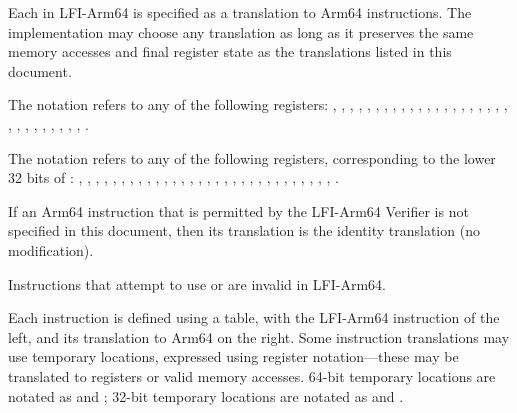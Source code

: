 
\providecommand{\xbase}{\code{x27}\xspace}
\providecommand{\xaddr}{\code{x28}\xspace}
\providecommand{\xret}{\code{x30}\xspace}
\providecommand{\xsp}{\code{sp}\xspace}



\specitem
Each  in LFI-Arm64 is specified as a translation to Arm64
instructions. The implementation may choose any translation as long as it
preserves the same memory accesses and final register state as the translations
listed in this document.


\specitem
The notation  refers to any of the following registers:
,
,
,
,
,
,
,
,
,
,
,
,
,
,
,
,
,
,
,
,
,
,
,
,
,
,
,
,
,
,
.

\specitem
The notation  refers to any of the following registers, corresponding to the lower 32 bits of :
,
,
,
,
,
,
,
,
,
,
,
,
,
,
,
,
,
,
,
,
,
,
,
,
,
,
,
,
,
,
.


\specitem
If an Arm64 instruction that is permitted by the LFI-Arm64 Verifier is not specified in this document, then its translation is the identity translation (no modification).

\specitem
Instructions that attempt to use \xbase or \xaddr are invalid in LFI-Arm64.

\specitem
Each instruction is defined using a table, with the LFI-Arm64 instruction of the left, and its translation to Arm64 on the right. Some instruction translations may use temporary locations, expressed using register notation---these may be translated to registers or valid memory accesses. 64-bit temporary locations are notated as  and ; 32-bit temporary locations are notated as  and .

